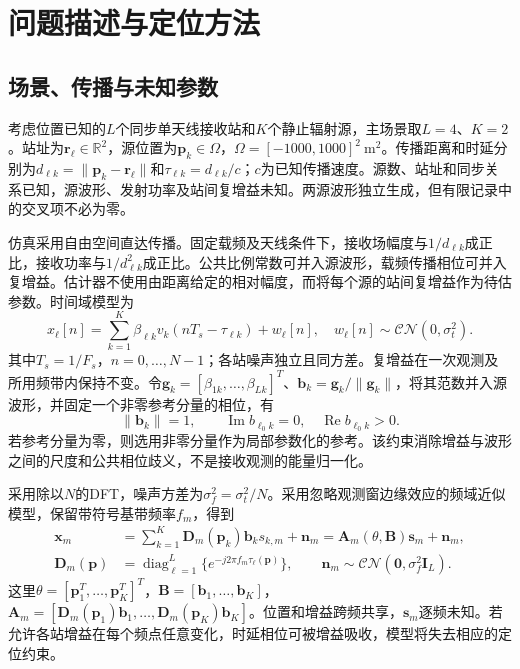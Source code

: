 \section{问题描述与定位方法}\label{sec:ug-model}
\subsection{场景、传播与未知参数}\label{sec:ug-assumptions}
考虑位置已知的$L$个同步单天线接收站和$K$个静止辐射源，主场景取$L=4$、$K=2$。站址为$\mathbf r_\ell\in\mathbb R^2$，源位置为$\mathbf p_k\in\Omega$，$\Omega=[-1000,1000]^2\ \mathrm{m}^2$。传播距离和时延分别为$d_{\ell k}=\|\mathbf p_k-\mathbf r_\ell\|$和$\tau_{\ell k}=d_{\ell k}/c$；$c$为已知传播速度。源数、站址和同步关系已知，源波形、发射功率及站间复增益未知。两源波形独立生成，但有限记录中的交叉项不必为零。

仿真采用自由空间直达传播。固定载频及天线条件下，接收场幅度与$1/d_{\ell k}$成正比，接收功率与$1/d_{\ell k}^2$成正比。公共比例常数可并入源波形，载频传播相位可并入复增益。估计器不使用由距离给定的相对幅度，而将每个源的站间复增益作为待估参数。时间域模型为
\begin{equation}\label{eq:ug-time}
x_\ell[n]=\sum_{k=1}^K\beta_{\ell k}v_k(nT_s-\tau_{\ell k})+w_\ell[n],
\quad w_\ell[n]\sim\mathcal{CN}(0,\sigma_t^2).
\end{equation}
其中$T_s=1/F_s$，$n=0,\ldots,N-1$；各站噪声独立且同方差。复增益在一次观测及所用频带内保持不变。令$\mathbf g_k=[\beta_{1k},\ldots,\beta_{Lk}]^T$、$\mathbf b_k=\mathbf g_k/\|\mathbf g_k\|$，将其范数并入源波形，并固定一个非零参考分量的相位，有
\begin{equation}\label{eq:ug-gauge}
\|\mathbf b_k\|=1,\qquad
\operatorname{Im}b_{\ell_0 k}=0,\quad \operatorname{Re}b_{\ell_0 k}>0.
\end{equation}
若参考分量为零，则选用非零分量作为局部参数化的参考。该约束消除增益与波形之间的尺度和公共相位歧义，不是接收观测的能量归一化。

采用除以$N$的DFT，噪声方差为$\sigma_f^2=\sigma_t^2/N$。采用忽略观测窗边缘效应的频域近似模型\cite{ref04,ref05}，保留带符号基带频率$f_m$，得到
\begin{equation}\label{eq:ug-model}
\begin{aligned}
\mathbf x_m&=\sum_{k=1}^K\mathbf D_m(\mathbf p_k)\mathbf b_k s_{k,m}+\mathbf n_m
=\mathbf A_m(\theta,\mathbf B)\mathbf s_m+\mathbf n_m,\\
\mathbf D_m(\mathbf p)&=\operatorname{diag}_{\ell=1}^L
\{e^{-j2\pi f_m\tau_\ell(\mathbf p)}\},\qquad
\mathbf n_m\sim\mathcal{CN}(\mathbf0,\sigma_f^2\mathbf I_L).
\end{aligned}
\end{equation}
这里$\theta=[\mathbf p_1^T,\ldots,\mathbf p_K^T]^T$，$\mathbf B=[\mathbf b_1,\ldots,\mathbf b_K]$，$\mathbf A_m=[\mathbf D_m(\mathbf p_1)\mathbf b_1,\ldots,\mathbf D_m(\mathbf p_K)\mathbf b_K]$。位置和增益跨频共享，$\mathbf s_m$逐频未知。若允许各站增益在每个频点任意变化，时延相位可被增益吸收，模型将失去相应的定位约束。

